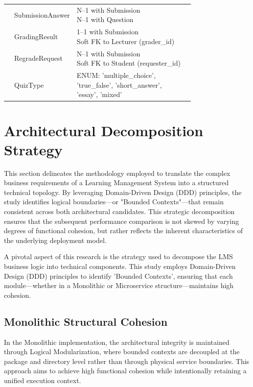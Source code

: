 \begin{table}[H]
\begin{tabularx}{\textwidth}{|l|X|X|X|}
& SubmissionAnswer 
& \makecell[l]{N--1 with Submission \\ N--1 with Question} 
& \\
\cline{2-3}

& GradingResult 
& \makecell[l]{1--1 with Submission \\ Soft FK to Lecturer (grader\_id)} 
& \\
\cline{2-3}

& RegradeRequest 
& \makecell[l]{N--1 with Submission \\ Soft FK to Student (requester\_id)} 
& \\
\cline{2-3}

& QuizType 
& \makecell[l]{ENUM: 'multiple\_choice', \\ 'true\_false', 'short\_answer', \\ 'essay', 'mixed'} 
& \\
\hline

\end{tabularx}
\end{table}

\section{Architectural Decomposition Strategy}

This section delineates the methodology employed to translate the complex business requirements of a Learning Management System into a structured technical topology. By leveraging Domain-Driven Design (DDD) principles, the study identifies logical boundaries—or "Bounded Contexts"—that remain consistent across both architectural candidates. This strategic decomposition ensures that the subsequent performance comparison is not skewed by varying degrees of functional cohesion, but rather reflects the inherent characteristics of the underlying deployment model.

A pivotal aspect of this research is the strategy used to decompose the LMS business logic into technical components. This study employs Domain-Driven Design (DDD) principles to identify 'Bounded Contexts', ensuring that each module—whether in a Monolithic or Microservice structure—maintains high cohesion.

\subsection{Monolithic Structural Cohesion}
In the Monolithic implementation, the architectural integrity is maintained through Logical Modularization, where bounded contexts are decoupled at the package and directory level rather than through physical service boundaries. This approach aims to achieve high functional cohesion while intentionally retaining a unified execution context.

